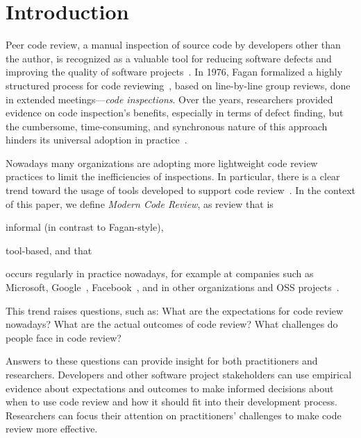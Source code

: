 
\section{Introduction} \label{sec:introduction}


Peer code review, a manual inspection of source code by developers other than
the author, is recognized as a valuable tool for reducing software defects and
improving the quality of software projects~\cite{ackerman1984software, ackerman1989software}.
In 1976, Fagan formalized a highly
structured process for code reviewing~\cite{fagan1976design}, based on line-by-line group
reviews, done in extended meetings---\emph{code inspections}. Over the years,
researchers provided evidence on code inspection's benefits, especially in
terms of defect finding, but the cumbersome, time-consuming, and synchronous
nature of this approach hinders its universal adoption in practice~\cite{shull2008inspecting}. %

Nowadays many organizations are adopting more lightweight code review
practices to limit the inefficiencies of inspections. In particular, there is a
clear trend toward the usage of tools developed to support code
review~\cite{rigby2012open}. In the context of this paper, we define
\emph{Modern Code Review}, as review that is \begin{inparaenum}[(1)]
\item informal (in contrast to Fagan-style), 
\item tool-based, and that 
\item occurs regularly in practice nowadays, for example at companies such as Microsoft, Google~\cite{kennedy2006online},
Facebook~\cite{tsotsis2011online}, and in other organizations and OSS projects~\cite{gerrit2012online}. \end{inparaenum}

This trend raises questions, such as: What are the
expectations for code review nowadays? What are the actual outcomes of code
review? What challenges do people face in code review?

Answers to these questions can provide insight for both practitioners and
researchers.  Developers and other software project stakeholders can use
empirical evidence about expectations and outcomes to make informed decisions
about when to use code review and how it should fit into their development
process. Researchers can focus their attention on practitioners' challenges to
make code review more effective.

